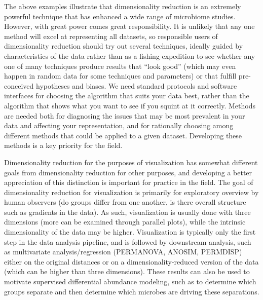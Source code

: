 The above examples illustrate that dimensionality reduction is an extremely powerful technique that has enhanced a wide range of microbiome studies. However, with great power comes great responsibility. It is unlikely that any one method will excel at representing all datasets, so responsible users of dimensionality reduction should try out several techniques, ideally guided by characteristics of the data rather than as a fishing expedition to see whether any one of many techniques produce results that “look good” (which may even happen in random data for some techniques and parameters) or that fulfill pre-conceived hypotheses and biases. We need standard protocols and software interfaces for choosing the algorithm that suits your data best, rather than the algorithm that shows what you want to see if you squint at it correctly. Methods are needed both for diagnosing the issues that may be most prevalent in your data and affecting your representation, and for rationally choosing among different methods that could be applied to a given dataset. Developing these methods is a key priority for the field.

Dimensionality reduction for the purposes of visualization has somewhat different goals from dimensionality reduction for other purposes, and developing a better appreciation of this distinction is important for practice in the field. The goal of dimensionality reduction for visualization is primarily for exploratory overview by human observers (do groups differ from one another, is there overall structure such as gradients in the data). As such, visualization is usually done with three dimensions (more can be examined through parallel plots), while the intrinsic dimensionality of the data may be higher. Visualization is typically only the first step in the data analysis pipeline, and is followed by downstream analysis, such as multivariate analysis/regression (PERMANOVA, ANOSIM, PERMDISP) either on the original distances or on a dimensionality-reduced version of the data (which can be higher than three dimensions). These results can also be used to motivate supervised differential abundance modeling, such as to determine which groups separate and then determine which microbes are driving these separations.

